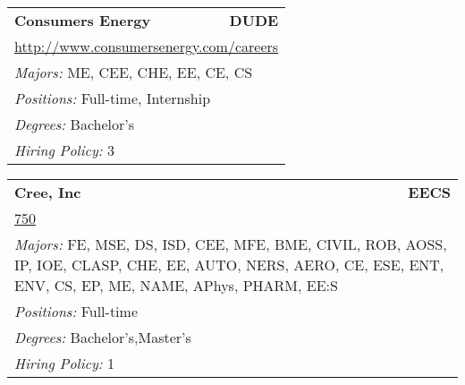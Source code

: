 \documentclass[twoside]{article}
\begin{document}
\begin{center}
\begin{multicols}{3}
\begin{FlushLeft}
\begin{minipage}{\columnwidth}
\end{minipage}
 
\begin{minipage}{\columnwidth}\begin{tabularx}{.95\columnwidth}{Xr}
                 {\Large\bf Consumers Energy} & {\Large\bf DUDE}\\
    \multicolumn{2}{p{.95\columnwidth}}{\url{http://www.consumersenergy.com/careers}}\\
    \multicolumn{2}{p{.95\columnwidth}}{\emph{Majors:} ME, CEE, CHE, EE, CE, CS}\\
    \multicolumn{2}{p{.95\columnwidth}}{\emph{Positions:} Full-time, Internship}\\
    \multicolumn{2}{p{.95\columnwidth}}{\emph{Degrees:} Bachelor's}\\
    \multicolumn{2}{p{.95\columnwidth}}{\emph{Hiring Policy:} 3}\\
    \end{tabularx}
    
\end{minipage}
 
\begin{minipage}{\columnwidth}\begin{tabularx}{.95\columnwidth}{Xr}
                 {\Large\bf Cree, Inc} & {\Large\bf EECS}\\
    \multicolumn{2}{p{.95\columnwidth}}{\url{750}}\\
    \multicolumn{2}{p{.95\columnwidth}}{\emph{Majors:} FE, MSE, DS, ISD, CEE, MFE, BME, CIVIL, ROB, AOSS, IP, IOE, CLASP, CHE, EE, AUTO, NERS, AERO, CE, ESE, ENT, ENV, CS, EP, ME, NAME, APhys, PHARM, EE:S}\\
    \multicolumn{2}{p{.95\columnwidth}}{\emph{Positions:} Full-time}\\
    \multicolumn{2}{p{.95\columnwidth}}{\emph{Degrees:} Bachelor's,Master's}\\
    \multicolumn{2}{p{.95\columnwidth}}{\emph{Hiring Policy:} 1}\\
    \end{tabularx}
    
\end{minipage}
 

\end{FlushLeft}
\end{multicols}
\end{center}
\end{document}
